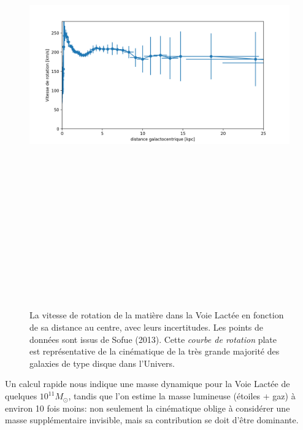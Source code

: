 \begin{figure}[htbp]
	\centering
		\includegraphics[height=20cm]{figs/rocurveMW.png}
	\caption[La vitesse de rotation de la matière dans la Voie Lactée]{La vitesse de rotation de la matière dans la Voie Lactée en fonction de sa distance au centre, avec leurs incertitudes. Les points de données sont issus de Sofue (2013). Cette \textit{courbe de rotation} plate est représentative de la cinématique de la très grande majorité des galaxies de type disque dans l'Univers.} 
	\label{f:rotcurve}
\end{figure}

Un calcul rapide nous indique une masse dynamique pour la Voie Lactée de quelques $10^{11} M_\odot$, tandis que l'on estime la masse lumineuse (étoiles + gaz) à environ 10 fois moins: non seulement la cinématique oblige à considérer une masse supplémentaire invisible, mais sa contribution se doit d'être dominante.

